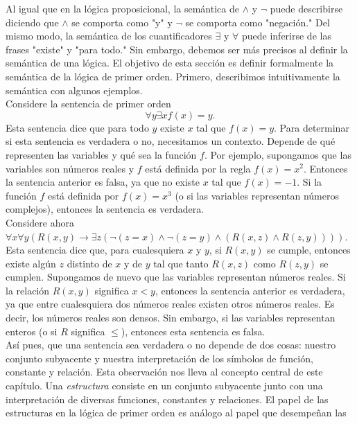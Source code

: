 \message{ !name(main.tex)}\documentclass[12pt,a4paper]{book}
\newcommand{\comillas}[1]{"#1"}
\begin{document}
    Al igual que en la lógica proposicional, la semántica de $\wedge$ y $\neg$ puede describirse diciendo que $\wedge$ se
    comporta como \comillas{y} y $\neg$ se comporta como \comillas{negación.} Del mismo modo, la semántica de los
    cuantificadores $\exists$ y $\forall$ puede inferirse de las frases \comillas{existe} y \comillas{para todo.} Sin
    embargo, debemos ser más precisos al definir la semántica de una lógica. El objetivo de esta sección es definir
    formalmente la semántica de la lógica de primer orden. Primero, describimos intuitivamente la semántica con algunos
    ejemplos.\\
    Considere la sentencia de primer orden
    \begin{equation*}
        \forall y\exists xf(x)=y.
    \end{equation*}
    Esta sentencia dice que para todo $y$ existe $x$ tal que $f(x)=y$. Para determinar si esta sentencia es verdadera o no,
    necesitamos un contexto. Depende de qué representen las variables y qué sea la función $f$. Por ejemplo, supongamos que
    las variables son números reales y $f$ está definida por la regla $f(x)=x^{2}$. Entonces la sentencia anterior es falsa,
    ya que no existe $x$ tal que $f(x)=-1$. Si la función $f$ está definida por $f(x)=x^{3}$ (o si las variables representan
    números complejos), entonces la sentencia es verdadera.\\
    Considere ahora $\forall x\forall y(R(x,y)\rightarrow\exists z(\neg(z=x)\wedge\neg(z=y)\wedge(R(x,z)\wedge R(z,y))))$.
    Esta sentencia dice que, para cualesquiera $x$ y $y$, si $R(x,y)$ se cumple, entonces existe algún $z$ distinto de $x$ y
    de $y$ tal que tanto $R(x,z)$ como $R(z,y)$ se cumplen. Supongamos de nuevo que las variables representan números
    reales. Si la relación $R(x,y)$ significa $x<y$, entonces la sentencia anterior es verdadera, ya que entre cualesquiera
    dos números reales existen otros números reales. Es decir, los números reales son densos. Sin embargo, si las variables
    representan enteros (o si $R$ significa $\leq$), entonces esta sentencia es falsa.\\
    Así pues, que una sentencia sea verdadera o no depende de dos cosas: nuestro conjunto subyacente y nuestra
    interpretación de los símbolos de función, constante y relación. Esta observación nos lleva al concepto central de este
    capítulo. Una \textit{estructura} consiste en un conjunto subyacente junto con una interpretación de diversas funciones,
    constantes y relaciones. El papel de las estructuras en la lógica de primer orden es análogo al papel que desempeñan las
\end{document}
